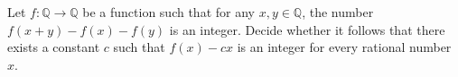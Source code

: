 Let $f : \mathbb Q \to \mathbb Q$ be a function such that for any $x,y \in \mathbb Q$, the number $f(x+y)-f(x)-f(y)$ is an integer. Decide whether it follows that there exists a constant $c$ such that $f(x) - cx$ is an integer for every rational number $x$.